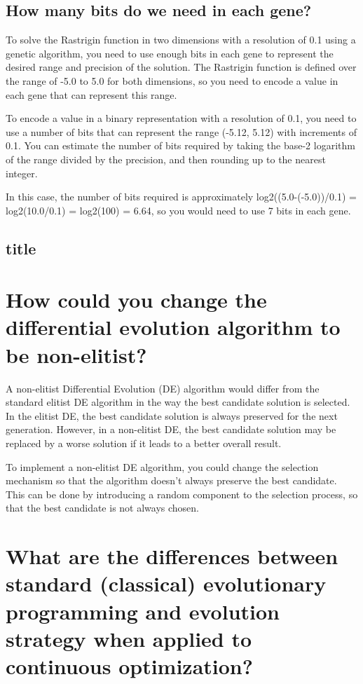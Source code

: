 \documentclass[conference]{IEEEtran}
\begin{document}
\subsection{How many bits do we need in each gene?}

To solve the Rastrigin function in two dimensions with a resolution of 0.1 using a genetic algorithm, you need to use enough bits in each gene to represent the desired range and precision of the solution. The Rastrigin function is defined over the range of -5.0 to 5.0 for both dimensions, so you need to encode a value in each gene that can represent this range.

To encode a value in a binary representation with a resolution of 0.1, you need to use a number of bits that can represent the range (-5.12, 5.12) with increments of 0.1. You can estimate the number of bits required by taking the base-2 logarithm of the range divided by the precision, and then rounding up to the nearest integer.

In this case, the number of bits required is approximately log2((5.0-(-5.0))/0.1) = log2(10.0/0.1) = log2(100) = 6.64, so you would need to use 7 bits in each gene.

\subsection{title}



\section{How could you change the differential evolution algorithm to be non-elitist?}

A non-elitist Differential Evolution (DE) algorithm would differ from the standard elitist DE algorithm in the way the best candidate solution is selected. In the elitist DE, the best candidate solution is always preserved for the next generation. However, in a non-elitist DE, the best candidate solution may be replaced by a worse solution if it leads to a better overall result.

To implement a non-elitist DE algorithm, you could change the selection mechanism so that the algorithm doesn't always preserve the best candidate. This can be done by introducing a random component to the selection process, so that the best candidate is not always chosen.


\section{What are the differences between standard (classical) evolutionary programming and evolution strategy when applied to continuous optimization?}
\end{document}
